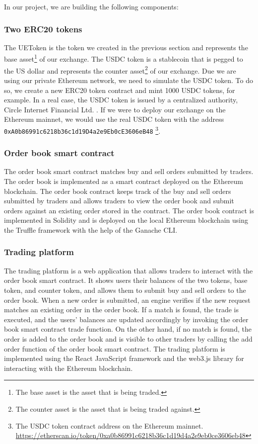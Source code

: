 In our project, we are building the following components:



\subsubsection{Two ERC20 tokens}


The UEToken is the token we created in the previous section and represents
the base asset\footnote{The base asset is the asset that is being traded.} of our exchange. The USDC token is a stablecoin that is pegged to
the US dollar and represents the counter asset\footnote{The counter asset is the asset that is being traded against.} of our exchange. Due we
are using our private Ethereum network, we need to simulate the USDC token. To do so, we create a new ERC20 token contract and mint 1000 USDC
tokens, for example. In a real case, the USDC token is issued by a centralized authority, Circle Internet Financial Ltd. \cite{usdc}. If
we were to deploy our exchange on the Ethereum mainnet, we would use the real USDC token with the address \texttt{0xA0b86991c6218b36c1d19D4a2e9Eb0cE3606eB48}
\footnote{The USDC token contract address on the Ethereum mainnet. \url{https://etherscan.io/token/0xa0b86991c6218b36c1d19d4a2e9eb0ce3606eb48}}.


\subsubsection{Order book smart contract}


The order book smart contract matches buy and sell orders submitted by traders.
The order book is implemented as a smart contract deployed on the Ethereum blockchain. The order book contract keeps track
of the buy and sell orders submitted by traders and allows traders to view the order book and submit orders against an existing order stored
in the contract. The order book contract is implemented in Solidity and is deployed on the local Ethereum blockchain using the Truffle framework with
the help of the Ganache CLI.


\subsubsection{Trading platform}


The trading platform is a web application that allows traders to interact with the order book smart contract. It shows
users their balances of the two tokens, base token, and counter token, and allows them to submit buy and sell orders to the order book. When a new order
is submitted, an engine verifies if the new request matches an existing order in the order book. If a match is found, the trade is
executed, and the users' balances are updated accordingly by invoking the order book smart contract trade function. On the other hand, if no match is found, the order
is added to the order book and is visible to other traders by calling the add order function of the order book smart contract. The trading platform is
implemented using the React JavaScript framework and the web3.js library for interacting with the Ethereum blockchain.


